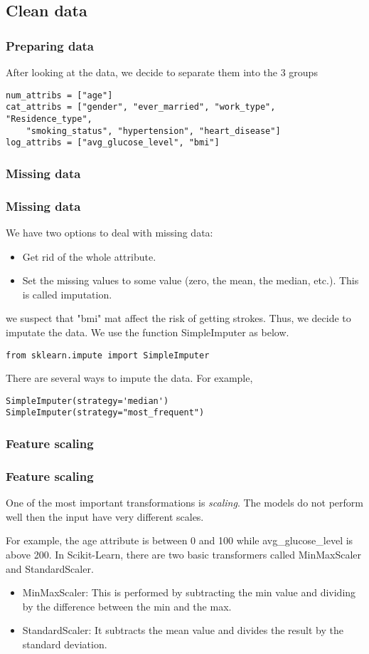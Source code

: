 \documentclass[10pt]{beamer}
\theoremstyle{definition}
\theoremstyle{remark}
\numberwithin{equation}{section}
\begin{document}
\subsection{Clean data}

\begin{frame}[fragile]
	\frametitle{Preparing data}
After looking at the data, we decide to separate them into the $3$ groups 
		\begin{lstlisting}
num_attribs = ["age"]
cat_attribs = ["gender", "ever_married", "work_type", "Residence_type", 
	"smoking_status", "hypertension", "heart_disease"]
log_attribs = ["avg_glucose_level", "bmi"]
		\end{lstlisting}
\end{frame}

\subsubsection{Missing data}
\begin{frame}[fragile]
	\frametitle{Missing data }
We have two options to deal with missing data:
\begin{itemize}
	\item Get rid of the whole attribute.
	\item  Set the missing values to some value (zero, the mean, the median, etc.). This is called imputation.
\end{itemize}

we suspect that "bmi" mat affect the risk of getting strokes. Thus, we decide to imputate the data.
We use the function SimpleImputer as below.
	\begin{lstlisting}
from sklearn.impute import SimpleImputer 
	\end{lstlisting}
There are several ways to impute the data. For example,

\begin{lstlisting}
SimpleImputer(strategy='median')
SimpleImputer(strategy="most_frequent")
\end{lstlisting} 
\end{frame}
\subsubsection{Feature scaling}
\begin{frame}\frametitle{Feature scaling}
	One of the most important transformations is \textit{scaling}. The models do not perform well then the input have very different scales. 
	
	For example, the age attribute is between 0 and 100 while avg\_glucose\_level is above 200.
	In Scikit-Learn, there are two basic transformers called MinMaxScaler and StandardScaler.
	
	\begin{itemize}
		\item MinMaxScaler: This is performed by subtracting the min value and dividing by the difference between the min and the max.
		
		\item StandardScaler: It subtracts the mean value and divides the result by the standard deviation.
	\end{itemize}
\end{frame}
\end{document}
